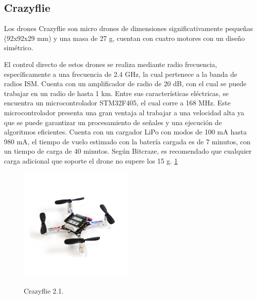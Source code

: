 \subsection*{Crazyflie}
Los drones Crazyflie son micro drones de dimensiones significativamente pequeñas (92x92x29 mm) y una masa de 27 g, cuentan con cuatro motores con un diseño simétrico. 

El control directo de estos drones se realiza mediante radio frecuencia, específicamente a una frecuencia de 2.4 GHz, la cual pertenece a la banda de radios ISM. Cuenta con un amplificador de radio de 20 dB, con el cual se puede trabajar en un radio de hasta 1 km. Entre sus características eléctricas, se encuentra un microcontrolador STM32F405, el cual corre a 168 MHz. Este microcontrolador presenta una gran ventaja al trabajar a una velocidad alta ya que se puede garantizar un procesamiento de señales y una ejecución de algoritmos eficientes. Cuenta con un cargador LiPo con modos de 100 mA hasta 980 mA, el tiempo de vuelo estimado con la batería cargada es de 7 minutos, con un tiempo de carga de 40 minutos. Según Bitcraze, es recomendado que cualquier carga adicional que soporte el drone no supere los 15 g. \ref{fig:Crazyflie 2.1}

\begin{figure}[t]
    \centering
    \includegraphics[width=0.5\textwidth]{figuras/crazyflie_2.1_585px.jpg}
    \caption{Crazyflie 2.1.}
    \cite{Crazyflie_2.1}
    \label{fig:Crazyflie 2.1}
\end{figure}

